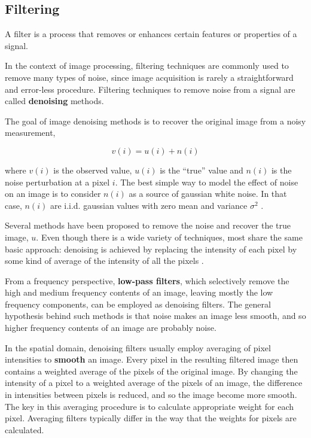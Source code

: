 \subsection*{Filtering}

A filter is a process that removes or enhances certain features or properties of a signal.

In the context of image processing, filtering techniques are commonly used to remove many types of noise, since image acquisition is rarely a straightforward and error-less procedure. Filtering techniques to remove noise from a signal are called \textbf{denoising} methods.

The goal of image denoising methods is to recover the original image from a noisy measurement,

\begin{equation}
v(i) = u(i) + n(i)
\end{equation}

where $v(i)$ is the observed value, $u(i)$ is the “true” value and $n(i)$ is the noise perturbation at a pixel $i$. The best simple way to model the effect of noise on an image is to consider $n(i)$ as a source of gaussian white noise. In that case, $n(i)$ are i.i.d. gaussian values with zero mean and variance $\sigma^2$ .

Several methods have been proposed to remove the noise
and recover the true image, $u$. Even though there is a wide variety of techniques, most share the same basic approach: denoising is achieved by replacing the intensity of each pixel by some kind of average of the intensity of all the pixels \cite{buades2005non}.

From a frequency perspective, \textbf{low-pass filters}, which selectively remove the high and medium frequency contents of an image, leaving mostly the low frequency components, can be employed as denoising filters. The general hypothesis behind such methods is that noise makes an image less smooth, and so higher frequency contents of an image are probably noise.

In the spatial domain, denoising filters usually employ averaging of pixel intensities to \textbf{smooth} an image. Every pixel in the resulting filtered image then contains a weighted average of the pixels of the original image. By changing the intensity of a pixel to a weighted average of the pixels of an image, the difference in intensities between pixels is reduced, and so the image become more smooth. The key in this averaging procedure is to calculate appropriate weight for each pixel. Averaging filters typically differ in the way that the weights for pixels are calculated.

